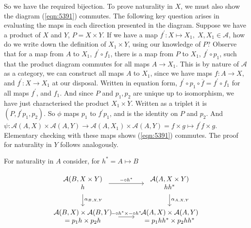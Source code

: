 \documentclass{article}
\begin{document}
So we have the required bijection. To prove naturality in $X$, we must also show the diagram (\ref{eqn:5391}) commutes. The following key question arises in evaluating the maps in each direction presented in the diagram. Suppose we have a product of $X$ and $Y$, $P = X \times Y$. If we have a map $f^\prime: X \mapsto X_1, \; X,X_1 \in \mathcal{A}$, how do we write down the definition of $X_1 \times Y$, using our knowledge of $P$? Observe that for a map from $A$ to $X_1$, $f^\prime \circ f_1$, there is a map from $P$ to $X_1$, $f^\prime \circ p_1$, such that the product diagram commutes for all maps $A \rightarrow X_1$. This is by nature of $\mathcal{A}$ as a category, we can construct all maps $A$ to $X_1$, since we have maps $f \colon A \rightarrow X$, and $f^\prime \colon X \rightarrow X_1$ at our disposal. Written in equation form, $f^\prime \circ p_1 \circ \overline{f} = f^\prime \circ f_1$ for all maps $f^\prime$, and $f_1$. And since $P$ and $p_1, p_2$ are unique up to isomorphism, we have just characterised the product $X_1 \times Y$. Written as a triplet it is $(P, f^\prime p_1, p_2)$. So $\phi$ maps $p_1$ to $f^\prime p_1$, and is the identity on $P$ and $p_2$. And $\psi\colon \mathcal{A}(A,X) \times \mathcal{A}(A,Y) \rightarrow \mathcal{A}(A,X_1) \times \mathcal{A}(A,Y) = f \times g \mapsto f^\prime f \times g$. Elementary checking with these maps shows (\ref{eqn:5391}) commutes. The proof for naturality in $Y$ follows analogously.

For naturality in $A$ consider, for $h^* = A \mapsto B$

\begin{equation}
  \label{eqn:5393}
  \begin{tikzcd}
    \begin{array}{c}
      \mathcal{A}(B, X \times Y) \\
      h
    \end{array}
    \arrow[r, "\mathit{-} \circ h^*"] \arrow[d, "\alpha_{B,X,Y}"]
    &
    \begin{array}{c}
      \mathcal{A}(A, X \times Y) \\
      hh^*
    \end{array}
    \arrow[d, "\alpha_{A,X,Y}"]\\
    \begin{array}{c}
      \mathcal{A}(B,X) \times \mathcal{A}(B,Y) \\
      = p_1h \times p_2h
     \end{array}
    \arrow[r, "\;\mathit{-} \circ h^* \times \mathit{-} \circ h^*\;"]
    &
    \begin{array}{c}
      \mathcal{A}(A,X) \times \mathcal{A}(A,Y) \\
      = p_1hh^* \times p_2hh^*
    \end{array}
  \end{tikzcd}
\end{equation}
\end{document}
